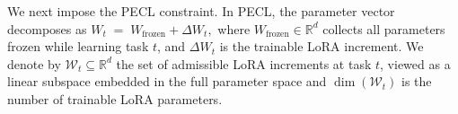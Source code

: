 \documentclass{article}
\theoremstyle{plain}
\theoremstyle{definition}
\theoremstyle{remark}
\begin{document}



We next impose the PECL constraint. In PECL, the parameter vector decomposes as
$
W_t \;=\; W_{\mathrm{frozen}} + \Delta W_t,
$
where $W_{\mathrm{frozen}}\in\mathbb{R}^d$ collects all parameters frozen while learning task $t$, and $\Delta W_t$ is the trainable LoRA increment. We denote by $\mathcal{W}_t \subseteq \mathbb{R}^d$ the set of admissible LoRA increments at task $t$, viewed as a linear subspace embedded in the full parameter space and $\dim(\mathcal{W}_t)$ is the number of trainable LoRA parameters. 
\end{document}
